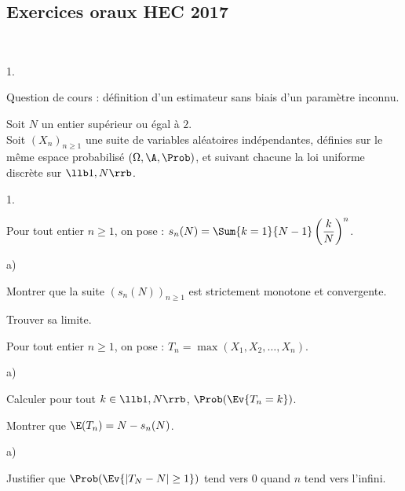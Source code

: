\subsection*{Exercices oraux HEC 2017}


\begin{exerciceAP}~
  \begin{noliste}{1.}
    \setlength{\itemsep}{2mm}
    \item Question de cours : définition d'un estimateur sans biais
    d'un paramètre inconnu.
  \end{noliste}
  
  \noindent
  Soit $N$ un entier supérieur ou égal à $2$.\\
  Soit $(X_n)_{n\geq 1}$ une suite de variables aléatoires 
  indépendantes, définies sur le même espace probabilisé 
  $(\Omega, \A, \Prob)$, et suivant chacune la loi uniforme discrète
  sur $\llb 1,N \rrb$.
  \begin{noliste}{1.}
    \setlength{\itemsep}{2mm}
    \setcounter{enumi}{1}
    \item Pour tout entier $n\geq 1$, on pose : $s_n(N) = 
    \Sum{k=1}{N-1} \left( \dfrac{k}{N} \right)^n$.
    \begin{noliste}{a)}
    \setlength{\itemsep}{2mm}
      \item Montrer que la suite $(s_n(N))_{n\geq 1}$ est 
      strictement monotone et convergente.
      
      \item Trouver sa limite.
    \end{noliste}
    
    \item Pour tout entier $n\geq 1$, on pose : $T_n = \max(X_1,
    X_2, \ldots, X_n)$.
    \begin{noliste}{a)}
    \setlength{\itemsep}{2mm}
      \item Calculer pour tout $k\in \llb 1,N \rrb$, $\Prob(
      \Ev{T_n=k})$.
      
      \item Montrer que $\E(T_n) = N - s_n(N)$.
    \end{noliste}
    
    \item 
    \begin{noliste}{a)}
    \setlength{\itemsep}{2mm}
      \item Justifier que $\Prob(\Ev{ \vert T_N - N \vert \geq 1})$
      tend vers $0$ quand $n$ tend vers l'infini.
      

\end{noliste}
\end{noliste}
\end{exerciceAP}
